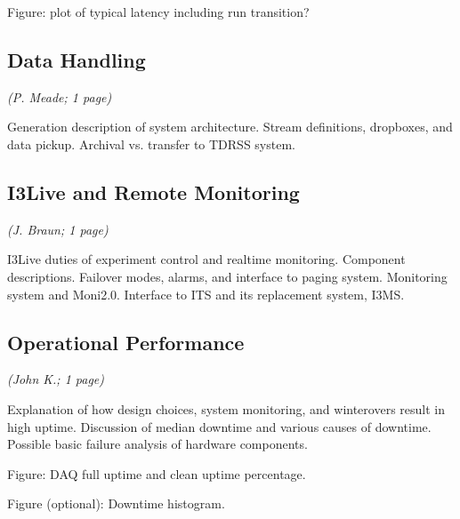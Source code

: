Figure: plot of typical latency including run transition?

\subsection{Data Handling}
\textsl{(P. Meade; 1 page)}

Generation description of system architecture.  Stream definitions, dropboxes,
and data pickup.  Archival vs. transfer to TDRSS system.  

\subsection{I3Live and Remote Monitoring}
\textsl{(J. Braun; 1 page)}

I3Live duties of experiment control and realtime monitoring.  Component
descriptions.  Failover modes, alarms, and interface to paging system.
Monitoring system and Moni2.0.  Interface to ITS and its replacement
system, I3MS. 

\subsection{Operational Performance}
\textsl{(John K.; 1 page)}

Explanation of how design choices, system monitoring, and winterovers result in
high uptime.  Discussion of median downtime and various causes of downtime.
Possible basic failure analysis of hardware components.  

Figure: DAQ full uptime and clean uptime percentage.

Figure (optional): Downtime histogram.  
